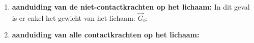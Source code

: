 \documentclass{ximera}
\begin{document}
\begin{question}
\begin{hint}
\begin{hint}
\begin{enumerate}
 \item \textbf{aanduiding van de niet-contactkrachten op het lichaam:}\newline
 In dit geval is er enkel het gewicht van het lichaam: $\vec G_b$:
 \begin{center}
%    
% 
% 
\end{center}
 
 \item \textbf{aanduiding van alle contactkrachten op het lichaam:} \newline


\end{enumerate}
\end{hint}
\end{hint}
\end{question}
\end{document}
